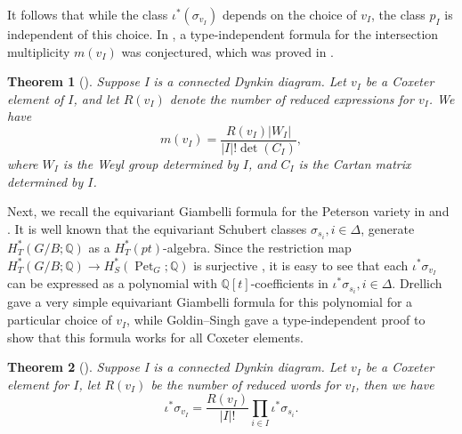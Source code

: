 \documentclass[11pt, letterpaper]{amsart}
\numberwithin{equation}{section}
\newtheorem{theorem}{Theorem}[section]
\DeclareMathOperator{\Pet}{Pet}
\begin{document}
It follows that while the class $\iota^*\left(\sigma_{v_I}\right)$ depends on the choice of $v_I$, the class $p_I$ is independent of this choice. In \cite[Remark 7.7]{Goldin2024positivity}, a type-independent formula for the intersection multiplicity $m\left(v_I\right)$ was conjectured, which was proved in \cite{goldin2021equivariant}.

\begin{theorem}[]
Suppose I is a connected Dynkin diagram. Let $v_I$ be a Coxeter element of $I$, and let $R\left(v_I\right)$ denote the number of reduced expressions for $v_I$. We have
\begin{equation} \label{eq-IMF}
m\left(v_I\right)=\frac{R\left(v_I\right)\left|W_I\right|}{|I|!\operatorname{det}\left(C_I\right)},
\end{equation}
where $W_I$ is the Weyl group determined by $I$, and $C_I$ is the Cartan matrix determined by $I$.
\end{theorem}

Next, we recall the equivariant Giambelli formula for the Peterson variety in \cite{drellich2015monk} and \cite{goldin2021equivariant}. It is well known that the equivariant Schubert classes $\sigma_{s_i}, i\in\Delta$, generate $H_T^*(G / B;\mathbb{Q})$ as a $H_T^*(p t)$-algebra. Since the restriction map $H_T^*\left(G/B ; \mathbb{Q}\right) \rightarrow H_S^*\left(\Pet_{G} ; \mathbb{Q}\right)$ is surjective \cite{harada2015equivariant}, it is easy to see that each $\iota^* \sigma_{v_I}$ can be expressed as a polynomial with $\mathbb{Q}[t]$-coefficients in $\iota^* \sigma_{s_i}, i\in\Delta$. Drellich  \cite{drellich2015monk} gave a very simple equivariant Giambelli formula for this polynomial for a particular choice of $v_I$, while Goldin--Singh \cite{goldin2021equivariant} gave a type-independent proof to show that this formula works for all Coxeter elements.

\begin{theorem}[]
Suppose I is a connected Dynkin diagram. Let $v_I$ be a Coxeter element for $I$, let $R\left(v_I\right)$ be the number of reduced words for $v_I$, then we have
\begin{equation}\label{eq-Giambelli}
   \iota^* \sigma_{v_I}=\frac{R\left(v_I\right)}{|I|!}\prod_{i \in I} \iota^* \sigma_{s_i}.
\end{equation}
\end{theorem}
\end{document}
